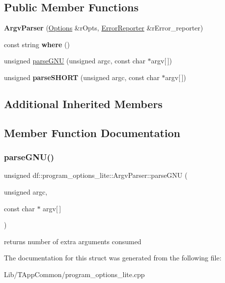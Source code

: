 \subsection*{Public Member Functions}
\begin{DoxyCompactItemize}
\item 
\mbox{\label{structdf_1_1program__options__lite_1_1_argv_parser_a53775823e982fd5946dfcd484316522c}} 
{\bfseries Argv\+Parser} (\hyperlink{structdf_1_1program__options__lite_1_1_options}{Options} \&r\+Opts, \hyperlink{structdf_1_1program__options__lite_1_1_error_reporter}{Error\+Reporter} \&r\+Error\+\_\+reporter)
\item 
\mbox{\label{structdf_1_1program__options__lite_1_1_argv_parser_a8612ce7734bdd05e7f7014c56665ea62}} 
const string {\bfseries where} ()
\item 
unsigned \hyperlink{structdf_1_1program__options__lite_1_1_argv_parser_adbb297897d306bbc09390750c297d823}{parse\+G\+NU} (unsigned argc, const char $\ast$argv\mbox{[}$\,$\mbox{]})
\item 
\mbox{\label{structdf_1_1program__options__lite_1_1_argv_parser_a9fa36499ff6f0d2f9f4609f63885faed}} 
unsigned {\bfseries parse\+S\+H\+O\+RT} (unsigned argc, const char $\ast$argv\mbox{[}$\,$\mbox{]})
\end{DoxyCompactItemize}
\subsection*{Additional Inherited Members}


\subsection{Member Function Documentation}
\mbox{\label{structdf_1_1program__options__lite_1_1_argv_parser_adbb297897d306bbc09390750c297d823}} 
\subsubsection{\texorpdfstring{parse\+G\+N\+U()}{parseGNU()}}
{\footnotesize\ttfamily unsigned df\+::program\+\_\+options\+\_\+lite\+::\+Argv\+Parser\+::parse\+G\+NU (\begin{DoxyParamCaption}\item[{unsigned}]{argc,  }\item[{const char $\ast$}]{argv\mbox{[}$\,$\mbox{]} }\end{DoxyParamCaption})}

returns number of extra arguments consumed 

The documentation for this struct was generated from the following file\+:\begin{DoxyCompactItemize}
\item 
Lib/\+T\+App\+Common/program\+\_\+options\+\_\+lite.\+cpp\end{DoxyCompactItemize}
